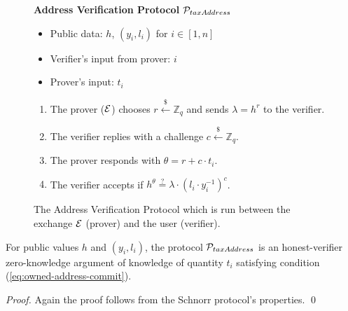 \begin{figure}[h]
\begin{mdframed}

\begin{center}
    \textbf{Address Verification Protocol} $\mathcal{P}_{taxAddress}$
\end{center}

    \begin{itemize}[$\cdot$]
        \item Public data: $h$, $(y_i, l_i)$ for $i \in [1, n]$
        \item Verifier's input from prover: $i$
        \item Prover's input: $t_i$
    \end{itemize}

    \begin{enumerate}
        \item The prover ($\mathcal{E}$) chooses $r \xleftarrow{\$} \mathbb{Z}_q$
            and sends $\lambda = h^r$ to the verifier.
        \item The verifier replies with a challenge $c \xleftarrow{\$} \mathbb{Z}_q$.
        \item The prover responds with $\theta = r + c \cdot t_i$.
        \item The verifier accepts if $h^\theta \stackrel{?}{=} \lambda \cdot (l_i \cdot y_i^{-1})^c$.
    \end{enumerate}

\end{mdframed}
\caption{
    The Address Verification Protocol which is run between the exchange $\mathcal{E}$
    (prover) and the user (verifier).
}
\label{fig:taxation_verification_proto}
\end{figure}

\begin{theorem}
    For public values $h$ and $(y_i, l_i)$, the protocol
    $\mathcal{P}_{taxAddress}$ is an honest-verifier zero-knowledge argument of
    knowledge of quantity $t_i$ satisfying condition (\ref{eq:owned-address-commit}).
\end{theorem}
\begin{proof}
    Again the proof follows from the Schnorr protocol's properties. \qed
\end{proof}
